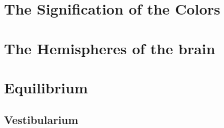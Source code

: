 \documentclass[../main.tex]{subfiles}
\begin{document}




\chapter{The Signification of the Colors}



\chapter{The Hemispheres of the brain}



\chapter{Equilibrium}



\section{Vestibularium}


\end{document}
